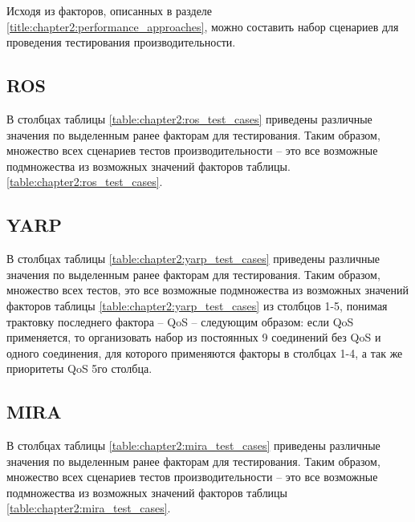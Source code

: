 Исходя из факторов, описанных в разделе \ref{title:chapter2:performance_approaches}, можно составить набор сценариев для проведения тестирования производительности.

\subsection{ROS}
В столбцах таблицы \ref{table:chapter2:ros_test_cases} приведены различные значения по выделенным ранее факторам для тестирования. Таким образом, множество всех сценариев тестов производительности -- это все возможные подмножества из возможных значений факторов таблицы. \ref{table:chapter2:ros_test_cases}.


\subsection{YARP}
В столбцах таблицы \ref{table:chapter2:yarp_test_cases} приведены различные значения по выделенным ранее факторам для тестирования. Таким образом, множество всех тестов, это все возможные подмножества из возможных значений факторов таблицы \ref{table:chapter2:yarp_test_cases} из столбцов 1-5, понимая трактовку последнего фактора -- QoS -- следующим образом: если QoS применяется, то организовать набор из постоянных 9 соединений без QoS и одного соединения, для которого применяются факторы в столбцах 1-4, а так же приоритеты QoS 5го столбца.


\subsection{MIRA}
В столбцах таблицы \ref{table:chapter2:mira_test_cases} приведены различные значения по выделенным ранее факторам для тестирования. Таким образом, множество всех сценариев тестов производительности -- это все возможные подмножества из возможных значений факторов таблицы \ref{table:chapter2:mira_test_cases}.


